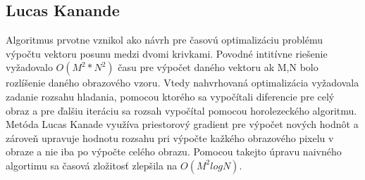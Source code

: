 \subsection{Lucas Kanande}
Algoritmus prvotne vznikol ako návrh pre časovú optimalizáciu problému výpočtu vektoru posunu medzi dvomi krivkami. Povodné intitívne riešenie vyžadovalo \begin{math} O(M^2 * N^2) \end{math} času pre výpočet daného vektoru ak M,N bolo rozlíšenie daného obrazového vzoru. Vtedy nahvrhovaná optimalizácia vyžadovala zadanie rozsahu hladania, pomocou ktorého sa vypočítali diferencie pre celý obraz a pre ďalšiu iteráciu sa rozsah vypočítal pomocou horolezeckého algoritmu. Metóda Lucas Kanade využíva priestorový gradient pre výpočet nových hodnôt a zároveň upravuje hodnotu rozsahu pri výpočte kažkého obrazového pixelu v obraze a nie iba po výpočte celého obrazu. Pomocou takejto úpravu naivného algortimu sa časová zložitosť zlepšila na \begin{math} O(M^2 log N) \end{math}\cite{lucas-kanade}.

